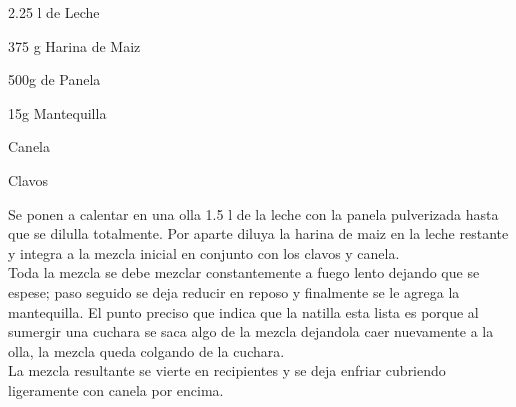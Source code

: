 

\begin{ingredientes}
\item 2.25 l de Leche
\item 375 g Harina de Maiz
\item 500g de Panela
\item 15g Mantequilla
\item Canela
\item Clavos
\end{ingredientes}
\preparacion
Se ponen a calentar en una olla 1.5 l de la leche con la panela pulverizada hasta que se dilulla totalmente. Por aparte diluya la harina de maiz en la leche restante y integra a la mezcla inicial en conjunto con los clavos y canela.\\

Toda la mezcla se debe mezclar constantemente a fuego lento dejando que se espese; paso seguido se deja reducir en reposo y finalmente se le agrega la mantequilla. El punto preciso que indica que la natilla esta lista es porque al sumergir una cuchara se saca algo de la mezcla dejandola caer nuevamente a la olla, la mezcla queda colgando de la cuchara.\\

La mezcla resultante se vierte en recipientes y se deja enfriar cubriendo ligeramente con canela por encima.  